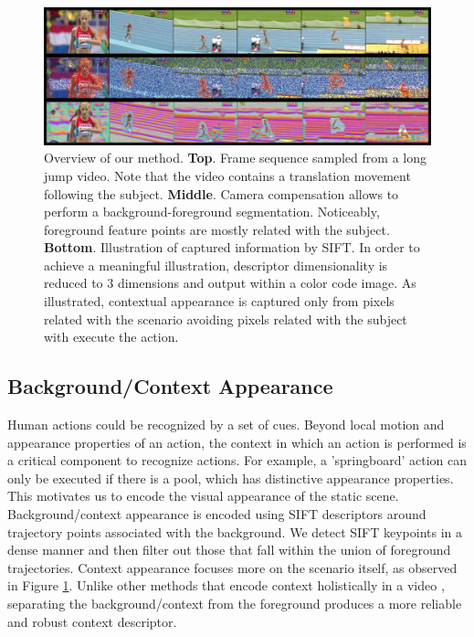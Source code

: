 \begin{figure}[t!]
\begin{center}
\includegraphics[width=0.98\linewidth]{fig/approach.png}
\end{center}
\caption{Overview of our method. \textbf{Top}. Frame sequence sampled from a long jump video. Note that the video contains a translation movement following the subject. \textbf{Middle}. Camera compensation allows to perform a background-foreground segmentation. Noticeably, foreground feature points are mostly related with the subject. \textbf{Bottom}. Illustration of captured information by SIFT. In order to achieve a meaningful illustration, descriptor dimensionality is reduced to 3 dimensions and output within a color code image. As illustrated, contextual appearance is captured only from pixels related with the scenario \ie avoiding pixels related with the subject with execute the action.}
\label{fig:approach}
\end{figure}


\subsection{Background/Context Appearance}
Human actions could be recognized by a set of cues. Beyond local motion and appearance properties of an action, the context in which an action is performed is a critical component to recognize actions. For example, a 'springboard' action can only be executed if there is a pool, which has distinctive appearance properties. This motivates us to encode the visual appearance of the static scene. Background/context appearance is encoded using SIFT descriptors \cite{lowe2004} around trajectory points associated with the background. We detect SIFT keypoints in a dense manner and then filter out those that fall within the union of foreground trajectories. Context appearance focuses more on the scenario itself, as observed in Figure \ref{fig:approach}.  Unlike other methods that encode context holistically in a video \cite{marszalek2009}, separating the background/context from the foreground produces a more reliable and robust context descriptor.

